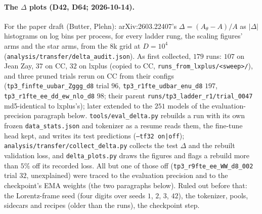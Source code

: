 \documentclass[11pt]{article}
\newcommand{\code}[1]{\texttt{#1}}
\begin{document}
\paragraph{The $\Delta$ plots (D42, D64; 2026-10-14).} For the paper draft (Butter, Plehn): arXiv:2603.22407's
$\Delta=(A_\theta-A)/A$ as $|\Delta|$ histograms on log bins per process, for every ladder rung, the scaling figures'
arms and the star arms, from the $8$k grid at $D=10^4$ (\code{analysis/transfer/delta\_audit.json}). As first
collected, $179$ runs: $107$ on Jean Zay, $37$ on CC, $32$ on lxplus (copied to CC, \code{runs\_from\_lxplus/<sweep>/}),
and three pruned trials rerun on CC from their configs (\code{tp3\_finfte\_uubar\_Zggg\_d8} trial $96$,
\code{tp3\_r1fte\_udbar\_enu\_d8} $197$, \code{tp3\_r1fte\_ee\_dd\_ew\_nlo\_d8} $98$; their parent
\code{runs/tp3\_ladder\_r1/trial\_0047} md5-identical to lxplus's); later extended to the $251$ models of the evaluation-precision paragraph below. \code{tools/eval\_delta.py} rebuilds a run with its own
frozen \code{data\_stats.json} and tokenizer as a resume reads them, the fine-tune head kept, and writes its test
predictions (\code{--tf32 on|off}); \code{analysis/transfer/collect\_delta.py} collects the test $\Delta$ and the rebuilt
validation loss, and \code{delta\_plots.py} draws the figures and flags a rebuild more than $5\%$ off its recorded loss.
All but one of those off (\code{tp3\_r9fte\_ee\_WW\_d8\_002} trial $32$, unexplained) were traced to the evaluation precision and to the checkpoint's EMA weights (the two paragraphs below). Ruled
out before that: the Lorentz-frame seed (four digits over seeds $1$, $2$, $3$, $42$), the tokenizer, pools, sidecars and
recipes (older than the runs), the checkpoint step.
\end{document}
